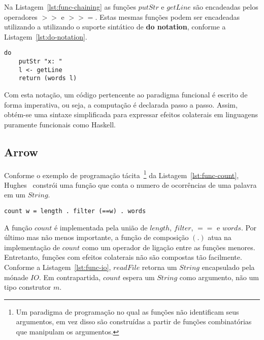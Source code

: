 \documentclass[10pt, conference]{IEEEtran}
\begin{document}
Na Listagem~\ref{lst:func-chaining} as funções $putStr$ e $getLine$ são encadeadas pelos operadores $>>$ e $>>=$. Estas mesmas funções podem ser encadeadas utilizando a utilizando o suporte sintático de \textbf{do notation}, conforme a Listagem~\ref{lst:do-notation}.

\begin{lstlisting}[caption={Encadeando Funções com Do Notation\protect\footref{fnt:haskell-language-report}}, label={lst:do-notation}]
do 
	putStr "x: "
	l <- getLine
	return (words l)
\end{lstlisting}

Com esta notação, um código pertencente ao paradigma funcional é escrito de forma imperativa, ou seja, a computação é declarada passo a passo. Assim, obtém-se uma sintaxe simplificada para expressar efeitos colaterais em linguagens puramente funcionais como Haskell.

\addtocounter{footnote}{1}

\subsection{Arrow}

\addtocounter{footnote}{1}

\addtocounter{footnote}{1}

Conforme o exemplo de programação tácita~\footnote{Um paradigma de programação no qual as funções não identificam seus argumentos, em vez disso são construídas a partir de funções combinatórias que manipulam os argumentos.} da Listagem~\ref{lst:func-count}, Hughes~\cite{hughes2005programming} constrói uma função que conta o numero de ocorrências de uma palavra em um $String$.

\begin{lstlisting}[caption={Função $count$\protect\footref{fnt:prog-with-arrows}}, label={lst:func-count}]
count w = length . filter (==w) . words
\end{lstlisting}

A função $count$ é implementada pela união de $length$, $filter$, $==$ e $words$. Por último mas não menos importante, a função de composição $(.)$ atua na implementação de $count$ como um operador de ligação entre as funções menores. Entretanto, funções com efeitos colaterais não são compostas tão facilmente. 
Conforme a Listagem~\ref{lst:func-io}, $readFile$ retorna um $String$ encapsulado pela mónade $IO$. Em contrapartida, $count$ espera um $String$ como argumento, não um tipo construtor $m$.
\end{document}
